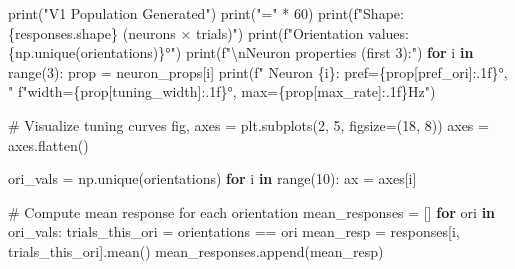 \documentclass[
  11pt,
  letterpaper,
  oneside,
  openany]{book}
\newenvironment{Shaded}{\begin{snugshade}}{\end{snugshade}}
\newcommand{\BuiltInTok}[1]{\textcolor[rgb]{0.00,0.23,0.31}{#1}}
\newcommand{\CharTok}[1]{\textcolor[rgb]{0.13,0.47,0.30}{#1}}
\newcommand{\CommentTok}[1]{\textcolor[rgb]{0.37,0.37,0.37}{#1}}
\newcommand{\ControlFlowTok}[1]{\textcolor[rgb]{0.00,0.23,0.31}{\textbf{#1}}}
\newcommand{\DecValTok}[1]{\textcolor[rgb]{0.68,0.00,0.00}{#1}}
\newcommand{\KeywordTok}[1]{\textcolor[rgb]{0.00,0.23,0.31}{\textbf{#1}}}
\newcommand{\NormalTok}[1]{\textcolor[rgb]{0.00,0.23,0.31}{#1}}
\newcommand{\OperatorTok}[1]{\textcolor[rgb]{0.37,0.37,0.37}{#1}}
\newcommand{\SpecialCharTok}[1]{\textcolor[rgb]{0.37,0.37,0.37}{#1}}
\newcommand{\SpecialStringTok}[1]{\textcolor[rgb]{0.13,0.47,0.30}{#1}}
\newcommand{\StringTok}[1]{\textcolor[rgb]{0.13,0.47,0.30}{#1}}
\begin{document}
\begin{Shaded}
\begin{Highlighting}[]
\BuiltInTok{print}\NormalTok{(}\StringTok{"V1 Population Generated"}\NormalTok{)}
\BuiltInTok{print}\NormalTok{(}\StringTok{"="} \OperatorTok{*} \DecValTok{60}\NormalTok{)}
\BuiltInTok{print}\NormalTok{(}\SpecialStringTok{f"Shape: }\SpecialCharTok{\{}\NormalTok{responses}\SpecialCharTok{.}\NormalTok{shape}\SpecialCharTok{\}}\SpecialStringTok{ (neurons × trials)"}\NormalTok{)}
\BuiltInTok{print}\NormalTok{(}\SpecialStringTok{f"Orientation values: }\SpecialCharTok{\{}\NormalTok{np}\SpecialCharTok{.}\NormalTok{unique(orientations)}\SpecialCharTok{\}}\SpecialStringTok{°"}\NormalTok{)}
\BuiltInTok{print}\NormalTok{(}\SpecialStringTok{f"}\CharTok{\textbackslash{}n}\SpecialStringTok{Neuron properties (first 3):"}\NormalTok{)}
\ControlFlowTok{for}\NormalTok{ i }\KeywordTok{in} \BuiltInTok{range}\NormalTok{(}\DecValTok{3}\NormalTok{):}
\NormalTok{    prop }\OperatorTok{=}\NormalTok{ neuron\_props[i]}
    \BuiltInTok{print}\NormalTok{(}\SpecialStringTok{f"  Neuron }\SpecialCharTok{\{}\NormalTok{i}\SpecialCharTok{\}}\SpecialStringTok{: pref=}\SpecialCharTok{\{}\NormalTok{prop[}\StringTok{\textquotesingle{}pref\_ori\textquotesingle{}}\NormalTok{]}\SpecialCharTok{:.1f\}}\SpecialStringTok{°, "}
          \SpecialStringTok{f"width=}\SpecialCharTok{\{}\NormalTok{prop[}\StringTok{\textquotesingle{}tuning\_width\textquotesingle{}}\NormalTok{]}\SpecialCharTok{:.1f\}}\SpecialStringTok{°, max=}\SpecialCharTok{\{}\NormalTok{prop[}\StringTok{\textquotesingle{}max\_rate\textquotesingle{}}\NormalTok{]}\SpecialCharTok{:.1f\}}\SpecialStringTok{Hz"}\NormalTok{)}

\CommentTok{\# Visualize tuning curves}
\NormalTok{fig, axes }\OperatorTok{=}\NormalTok{ plt.subplots(}\DecValTok{2}\NormalTok{, }\DecValTok{5}\NormalTok{, figsize}\OperatorTok{=}\NormalTok{(}\DecValTok{18}\NormalTok{, }\DecValTok{8}\NormalTok{))}
\NormalTok{axes }\OperatorTok{=}\NormalTok{ axes.flatten()}

\NormalTok{ori\_vals }\OperatorTok{=}\NormalTok{ np.unique(orientations)}
\ControlFlowTok{for}\NormalTok{ i }\KeywordTok{in} \BuiltInTok{range}\NormalTok{(}\DecValTok{10}\NormalTok{):}
\NormalTok{    ax }\OperatorTok{=}\NormalTok{ axes[i]}
    
    \CommentTok{\# Compute mean response for each orientation}
\NormalTok{    mean\_responses }\OperatorTok{=}\NormalTok{ []}
    \ControlFlowTok{for}\NormalTok{ ori }\KeywordTok{in}\NormalTok{ ori\_vals:}
\NormalTok{        trials\_this\_ori }\OperatorTok{=}\NormalTok{ orientations }\OperatorTok{==}\NormalTok{ ori}
\NormalTok{        mean\_resp }\OperatorTok{=}\NormalTok{ responses[i, trials\_this\_ori].mean()}
\NormalTok{        mean\_responses.append(mean\_resp)}
    

\end{Highlighting}
\end{Shaded}
\end{document}
